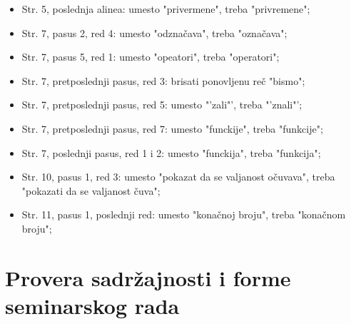 \documentclass[a4paper]{report}
\begin{document}
\begin{itemize}
  \item Str. 5, poslednja alinea: umesto "privermene", treba "privremene";
  \item Str. 7, pasus 2, red 4: umesto "odznačava", treba "označava";
  \item Str. 7, pasus 5, red 1: umesto "opeatori", treba "operatori";
  \item Str. 7, pretposlednji pasus, red 3: brisati ponovljenu reč "bismo";
  \item Str. 7, pretposlednji pasus, red 5: umesto "'zali"', treba "'znali"';
  \item Str. 7, pretposlednji pasus, red 7: umesto "funckije", treba "funkcije";
  \item Str. 7, poslednji pasus, red 1 i 2: umesto "funckija", treba "funkcija";
  \item Str. 10, pasus 1, red 3: umesto "pokazat da se valjanost očuvava", treba "pokazati da se valjanost čuva";
  \item Str. 11, pasus 1, poslednji red: umesto "konačnoj broju", treba "konačnom broju";
\end{itemize}



\section{Provera sadržajnosti i forme seminarskog rada}
\end{document}
